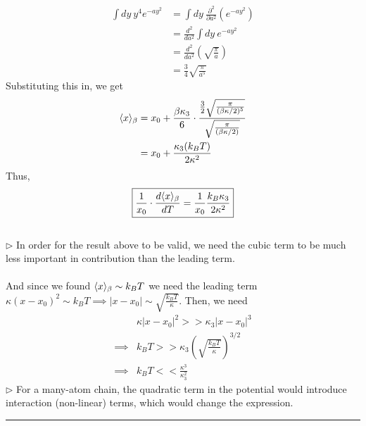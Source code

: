 \documentclass[11pt]{article}
\begin{document}
\begin{align*}
  \int dy~y^4 e^{-ay^2} &= \int dy ~ \frac{\partial^2}{\partial a^2} \left(e^{-ay^2}\right) \\
  &= \frac{d^2}{da^2} \int dy~e^{-ay^2} \\
  &= \frac{d^2}{da^2} \left(\sqrt{\frac{\pi}{a}}\right) \\
  &= \frac{3}{4} \sqrt{\frac{\pi}{a^5}}
\end{align*} Substituting this in, we get 
\begin{align*}
  \langle x \rangle_{\beta} &= x_0 + \frac{\beta \kappa_3}{6} \cdot \frac{\frac{3}{2}\sqrt{\frac{\pi}{(\beta \kappa/2)^5}}}{\sqrt{\frac{\pi}{(\beta \kappa/2)}}} \\
  &= x_0 + \frac{\kappa_3 (k_B T)}{2\kappa^2}
\end{align*} Thus,
$$ \boxed{\frac{1}{x_0} \cdot \frac{d\langle x \rangle_{\beta}}{dT}  = \frac{1}{x_0} \frac{k_B \kappa_3}{2\kappa^2} } $$\\
$\triangleright$ In order for the result above to be valid, we need the cubic term to be much less important in contribution than the leading term.
\\
\\
And since we found $\langle x \rangle_{\beta} \sim k_B T$ we need the leading term $\kappa(x-x_0)^2 \sim k_B T \implies |x-x_0| \sim \sqrt{\frac{k_B T}{\kappa}}$. Then, we need 
\begin{align*}
  &\kappa|x-x_0|^2 >> \kappa_3|x-x_0|^3 \\
  \implies& k_B T >> \kappa_3 \left(\sqrt{\frac{k_B T}{\kappa}}\right)^{3/2} \\
  \implies& k_B T << \frac{\kappa^3}{\kappa_3^2}
\end{align*} $\triangleright$ For a many-atom chain, the quadratic term in the potential would introduce interaction (non-linear) terms, which would change the expression.




\vskip 0.5cm
\hrule
\pagebreak
\end{document}
